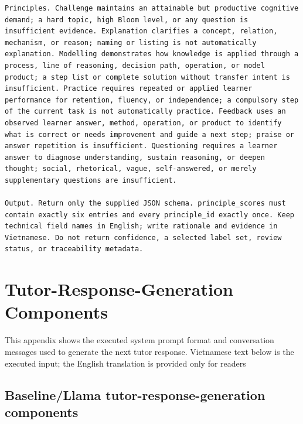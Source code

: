 \documentclass[conference]{IEEEtran}
\begin{document}
\begin{Verbatim}[breaklines=true,breakanywhere=true,fontsize=\footnotesize,formatcom=\rmfamily]
Principles. Challenge maintains an attainable but productive cognitive demand; a hard topic, high Bloom level, or any question is insufficient evidence. Explanation clarifies a concept, relation, mechanism, or reason; naming or listing is not automatically explanation. Modelling demonstrates how knowledge is applied through a process, line of reasoning, decision path, operation, or model product; a step list or complete solution without transfer intent is insufficient. Practice requires repeated or applied learner performance for retention, fluency, or independence; a compulsory step of the current task is not automatically practice. Feedback uses an observed learner answer, method, operation, or product to identify what is correct or needs improvement and guide a next step; praise or answer repetition is insufficient. Questioning requires a learner answer to diagnose understanding, sustain reasoning, or deepen thought; social, rhetorical, vague, self-answered, or merely supplementary questions are insufficient.

Output. Return only the supplied JSON schema. principle_scores must contain exactly six entries and every principle_id exactly once. Keep technical field names in English; write rationale and evidence in Vietnamese. Do not return confidence, a selected label set, review status, or traceability metadata.
\end{Verbatim}
\clearpage
\section{Tutor-Response-Generation Components}
\label{app:tutor-prompt}

This appendix shows the executed system prompt format and conversation messages used to generate the next tutor response. 
Vietnamese text below is the executed input; the English translation is provided only for readers

\subsection{Baseline/Llama tutor-response-generation components}
\end{document}
